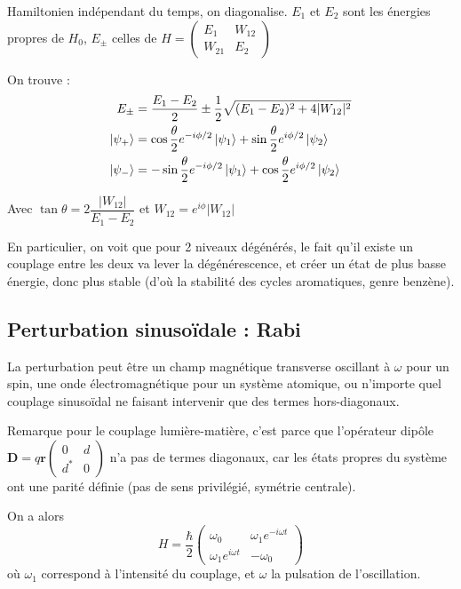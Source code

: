 \documentclass[a4paper]{report}
\begin{document}
   Hamiltonien indépendant du temps, on diagonalise. $E_1$ et $E_2$ sont les énergies propres de $H_0$, $E_\pm$ celles de  $H= \begin{pmatrix} E_1 & W_{12} \\ W_{21} & E_2  \end{pmatrix}$
   
   On trouve : \begin{align}  
   E_\pm &= \dfrac{E_1-E_2}{2}\pm\dfrac{1}{2}\sqrt{(E_1-E_2)^2+4|W_{12}|^2} \\   
   \ket{\psi_+} &= \cos \dfrac{\theta}{2} e^{-i\phi/2} \ket{\psi_1}+\sin \dfrac{\theta}{2} e^{i\phi/2} \ket{\psi_2} \\   
   \ket{\psi_-}&= -\sin \dfrac{\theta}{2} e^{-i\phi/2} \ket{\psi_1}+\cos \dfrac{\theta}{2} e^{i\phi/2} \ket{\psi_2} 
  \end{align}
   
   Avec $\tan \theta = 2 \dfrac{|W_{12}|}{E_1-E_2}$ et $W_{12}=e^{i\phi}|W_{12}|$
   
   En particulier, on voit que pour 2 niveaux dégénérés, le fait qu'il existe un couplage entre les deux va lever la dégénérescence, et créer un état de plus basse énergie, donc plus stable (d'où la stabilité des cycles aromatiques, genre benzène).
   
   \subsection{Perturbation sinusoïdale : Rabi}
   La perturbation peut être un champ magnétique transverse oscillant à $\omega$ pour un spin, une onde électromagnétique pour un système atomique, ou n'importe quel couplage sinusoïdal ne faisant intervenir que des termes hors-diagonaux.
   
   Remarque pour le couplage lumière-matière, c'est parce que l'opérateur dipôle $\textbf{D}=q\textbf{r}\begin{pmatrix}
   0 & d \\ d^* & 0
   \end{pmatrix}$ n'a pas de termes diagonaux, car les états propres du système ont une parité définie (pas de sens privilégié, symétrie centrale).
   
   On a alors \begin{equation}
    H=\dfrac{\hbar}{2} \begin{pmatrix} \omega_0 & \omega_1 e^{-i\omega t} \\ \omega_1 e^{i\omega t} & -\omega_0  \end{pmatrix}
\end{equation}    où $\omega_1$ correspond à l'intensité du couplage, et $\omega$ la pulsation de l'oscillation.
   
\end{document}
